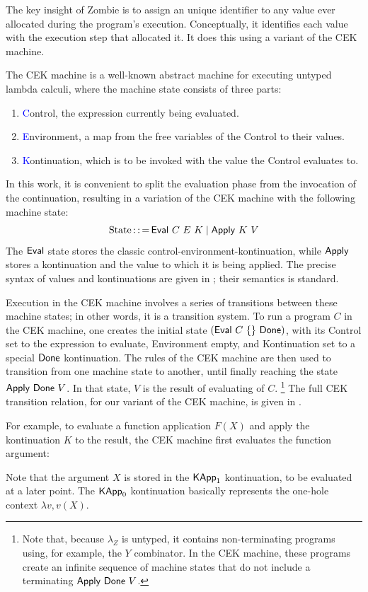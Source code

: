 The key insight of Zombie is to assign an unique identifier to any
value ever allocated during the program's execution. Conceptually, it
identifies each value with the execution step that allocated it. It
does this using a variant of the CEK machine.

The CEK machine is a well-known abstract machine for executing untyped
lambda calculi, where the machine state consists of three parts:

\begin{enumerate}
	\item \textcolor{blue}{C}ontrol, the expression currently being evaluated.
	\item \textcolor{blue}{E}nvironment,
          a map from the free variables of the Control to their values.
	\item \textcolor{blue}{K}ontinuation, which is to be invoked
          with the value the Control evaluates to.
\end{enumerate}

In this work, it is convenient to split the evaluation phase from the
invocation of the continuation, resulting in a variation of the CEK
machine with the following machine state:
\[
\text{State} \operatorname{::=} \Eval~C~\Env~K \mid \Apply~K~V
\]
The $\Eval$ state stores the classic control-environment-kontinuation,
while $\Apply$ stores a kontinuation and the value to which it is
being applied. The precise syntax of values and kontinuations are
given in ; their semantics is standard.

Execution in the CEK machine involves a series of transitions between
these machine states; in other words, it is a transition system. To
run a program $C$ in the CEK machine, one creates the initial state
$(\Eval~C~\{\}~\Done)$, with its Control set to the expression to
evaluate, Environment empty, and Kontinuation set to a special $\Done$
kontinuation. The rules of the CEK machine are then used to transition
from one machine state to another, until finally reaching the state
$\Apply~\Done~V$. In that state, $V$ is the result of evaluating of
$C$.%
\footnote{Note that, because $\lambda_Z$ is untyped, it contains
non-terminating programs using, for example, the $Y$ combinator. In
the CEK machine, these programs create an infinite sequence of machine
states that do not include a terminating $\Apply~\Done~V$.}
The full CEK transition relation,
  for our variant of the CEK machine,
  is given in .

For example, to evaluate a function application $F(X)$
  and apply the kontinuation $K$ to the result,
  the CEK machine first evaluates the function argument:
\begin{mathpar}
\end{mathpar}
Note that the argument $X$ is stored in the $\KApp_1$ kontinuation,
to be evaluated at a later point. The $\KApp_0$ kontinuation basically
represents the one-hole context $\lambda v, v(X)$.

